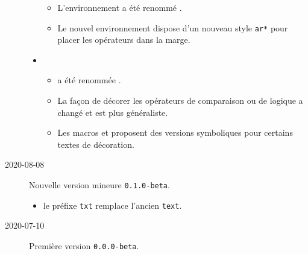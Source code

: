 \documentclass[12pt,a4paper]{article}
\begin{document}
\begin{description}
\begin{itemize}[itemsep=.5em]
\begin{itemize}[itemsep=.5em]
            \item L'environnement  a été renommé .
    
            \item Le nouvel environnement  dispose d'un nouveau style \verb#ar*# pour placer les opérateurs dans la marge.
        \end{itemize}
    
    
        \item {}
        \begin{itemize}[itemsep=.5em]
            \item {} a été renommée .
    
            \item La façon de décorer les opérateurs de comparaison ou de logique a changé et est plus généraliste.
    
            \item Les macros  et  proposent des versions symboliques pour certains textes de décoration.
        \end{itemize}
    \end{itemize}
    
    
    \separation


    \medskip
    \item[2020-08-08] Nouvelle version mineure \verb+0.1.0-beta+.
    
    \begin{itemize}[itemsep=.5em]
        \item {}
              le préfixe \verb#txt# remplace l'ancien \verb#text#.
    \end{itemize}
    
    
    \separation

    \medskip
    \item[2020-07-10] Première version \verb+0.0.0-beta+.

\end{description}
\end{document}
